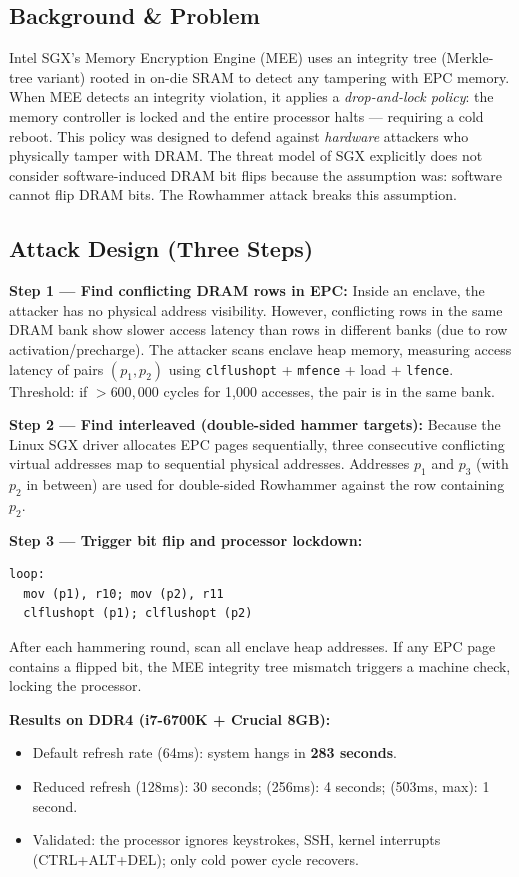 \documentclass[11pt,letterpaper]{article}
\begin{document}
\subsection*{Background \& Problem}
Intel SGX's Memory Encryption Engine (MEE) uses an integrity tree (Merkle-tree variant) rooted in on-die SRAM to detect any tampering with EPC memory.
When MEE detects an integrity violation, it applies a \emph{drop-and-lock policy}: the memory controller is locked and the entire processor halts — requiring a cold reboot.
This policy was designed to defend against \emph{hardware} attackers who physically tamper with DRAM.
The threat model of SGX explicitly does not consider software-induced DRAM bit flips because the assumption was: software cannot flip DRAM bits.
The Rowhammer attack breaks this assumption.

\subsection*{Attack Design (Three Steps)}
\textbf{Step 1 — Find conflicting DRAM rows in EPC:}
Inside an enclave, the attacker has no physical address visibility.
However, conflicting rows in the same DRAM bank show slower access latency than rows in different banks (due to row activation/precharge).
The attacker scans enclave heap memory, measuring access latency of pairs $(p_1, p_2)$ using \texttt{clflushopt} + \texttt{mfence} + load + \texttt{lfence}.
Threshold: if $>600{,}000$ cycles for 1,000 accesses, the pair is in the same bank.

\textbf{Step 2 — Find interleaved (double-sided hammer targets):}
Because the Linux SGX driver allocates EPC pages sequentially, three consecutive conflicting virtual addresses map to sequential physical addresses.
Addresses $p_1$ and $p_3$ (with $p_2$ in between) are used for double-sided Rowhammer against the row containing $p_2$.

\textbf{Step 3 — Trigger bit flip and processor lockdown:}
\begin{verbatim}
loop:
  mov (p1), r10; mov (p2), r11
  clflushopt (p1); clflushopt (p2)
\end{verbatim}
After each hammering round, scan all enclave heap addresses.
If any EPC page contains a flipped bit, the MEE integrity tree mismatch triggers a machine check, locking the processor.

\textbf{Results on DDR4 (i7-6700K + Crucial 8GB):}
\begin{itemize}
    \item Default refresh rate (64ms): system hangs in \textbf{283 seconds}.
    \item Reduced refresh (128ms): 30 seconds; (256ms): 4 seconds; (503ms, max): 1 second.
    \item Validated: the processor ignores keystrokes, SSH, kernel interrupts (CTRL+ALT+DEL); only cold power cycle recovers.
\end{itemize}
\end{document}
